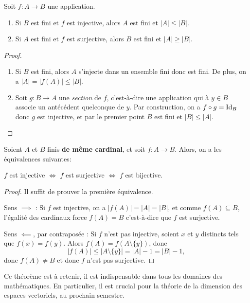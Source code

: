 \begin{proposition}
Soit $f : A\to B$ une application.
\begin{enumerate}
\item Si $B$ est fini et $f$ est injective, alors $A$ est fini et $|A|\leq |B|$.
\item Si $A$ est fini et $f$ est surjective, alors $B$ est fini et $|A|\geq |B|$.
\end{enumerate}
\end{proposition}
\begin{proof}
\begin{enumerate}
\item Si $B$ est fini, alors $A$ s'injecte dans un ensemble fini donc est fini. De plus, on a $|A|=|f(A)|\leq |B|$.
\item Soit $g:B\to A$ une \emph{section} de $f$, c'est-à-dire une application  qui à $y\in B$ associe un antécédent quelconque de $y$. Par construction, on a $f\circ g=\operatorname{Id}_{B}$ donc $g$ est injective, et par le premier point $B$ est fini et $|B| \leq |A|$.
\end{enumerate}
\end{proof}

\begin{theoreme}[IMPORTANT]
Soient $A$ et $B$ finis \textbf{de même cardinal}, et soit $f : A\to B$. Alors, on a les équivalences suivantes:
\begin{center}
$f$ est injective $\iff$ $f$ est surjective $\iff$ $f$ est  bijective.
\end{center}
\end{theoreme}
\begin{proof}
Il suffit de prouver la première équivalence.

Sens $\implies$ : Si $f$ est injective, on a $|f(A)|=|A|=|B|$, et comme $f(A)\subseteq B$, l'égalité des cardinaux force $f(A)=B$ c'est-à-dire que $f$ est surjective.

Sens $\impliedby$, par contraposée : Si $f$ n'est pas injective, soient $x$ et $y$ distincts tels que $f(x)=f(y)$. Alors $f(A) = f(A\setminus \{y\})$, donc 
\[
|f(A)| \leq |A\setminus \{y\}| = |A|-1 = |B|-1,
\]
donc $f(A) \neq B$ et donc $f$ n'est pas surjective.
\end{proof}

Ce théorème est à retenir, il est indispensable dans tous les domaines des mathématiques. En particulier, il est crucial pour la théorie de la dimension des espaces vectoriels, au prochain semestre.


